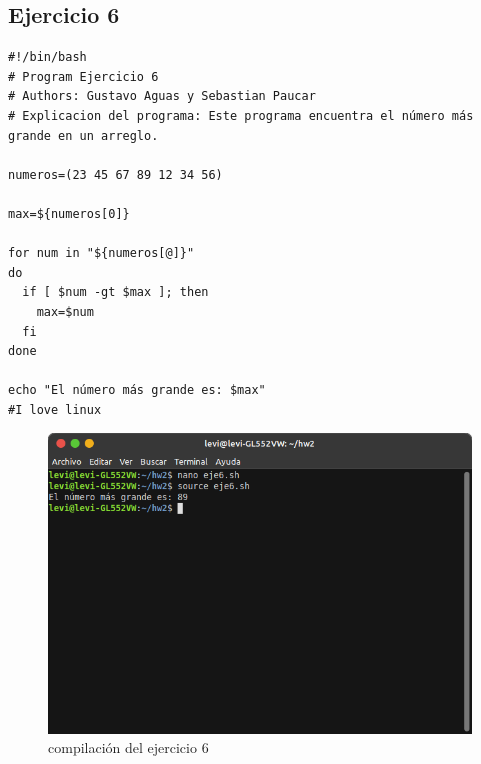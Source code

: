 \documentclass[11pt,twoside]{book}
\begin{document}
\subsection{Ejercicio 6}

\begin{lstlisting}
#!/bin/bash
# Program Ejercicio 6
# Authors: Gustavo Aguas y Sebastian Paucar
# Explicacion del programa: Este programa encuentra el número más grande en un arreglo.

numeros=(23 45 67 89 12 34 56)

max=${numeros[0]}

for num in "${numeros[@]}"
do
  if [ $num -gt $max ]; then
    max=$num
  fi
done

echo "El número más grande es: $max"
#I love linux
\end{lstlisting}
\begin{figure}[h]
    \centering
    \includegraphics[width=0.8\linewidth]{Tarea2/teje6.png}
    \caption{ compilación del ejercicio 6}
\end{figure}
\newpage
\end{document}
